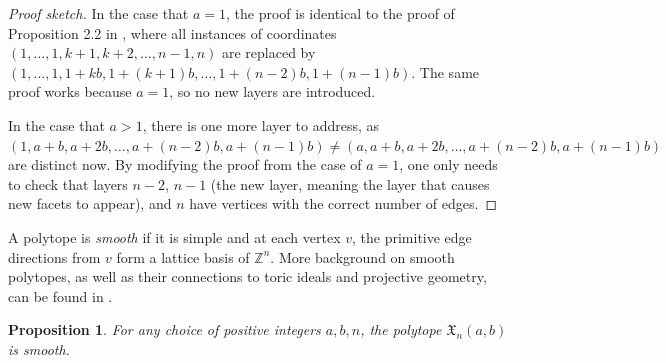 \documentclass[11pt]{amsart}
\newtheorem{proposition}[theorem]{Proposition}
\theoremstyle{definition}
\newcommand{\0}{\emptyset}
\begin{document}
\begin{proof}[Proof sketch]
In the case that $a=1$, the proof is identical to the proof of Proposition 2.2 in \cite{AW}, where all instances of coordinates $(1, \ldots, 1, k+1, k+2, \ldots, n-1, n)$ are replaced by $(1, \ldots, 1, 1+kb, 1+(k+1)b, \ldots, 1+(n-2)b, 1+(n-1)b)$. The same proof works because $a=1$, so no new layers are introduced.

In the case that $a >1$, there is one more layer to address, as $(1, a+b, a+2b, \ldots, a+(n-2)b, a+(n-1)b) \neq (a, a+b, a+2b, \ldots, a+(n-2)b, a+(n-1)b)$ are distinct now. By modifying the proof from the case of $a=1$, one only needs to check that layers $n-2$, $n-1$ (the new layer, meaning the layer that causes new facets to appear), and $n$ have vertices with the correct number of edges.
\end{proof}

 
A polytope is \textit{smooth} if it is simple and at each vertex $v$, the primitive edge directions from $v$ form a lattice basis of $\mathbb{Z}^n$. More background on smooth polytopes, as well as their connections to toric ideals and projective geometry, can be found in \cite{CLS}.
\begin{proposition}
     For any choice of positive integers $a,b,n$, the polytope $\mathfrak{X}_{n}(a,b)$ is smooth.
\end{proposition}
\end{document}
